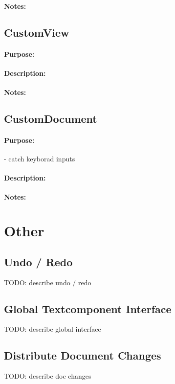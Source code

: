 \documentclass[11pt,a4paper]{article}
\begin{document}
\paragraph{Notes:}

\subsection{CustomView}
\paragraph{Purpose:}
\paragraph{Description:}
\paragraph{Notes:}

\subsection{CustomDocument}
\paragraph{Purpose:}
- catch keyborad inputs
\paragraph{Description:}
\paragraph{Notes:}



\section{Other}
\subsection{Undo / Redo}
TODO: describe undo / redo

\subsection{Global Textcomponent Interface}
TODO: describe global interface

\subsection{Distribute Document Changes}
TODO: describe doc changes



\newpage



\newpage

\end{document}
